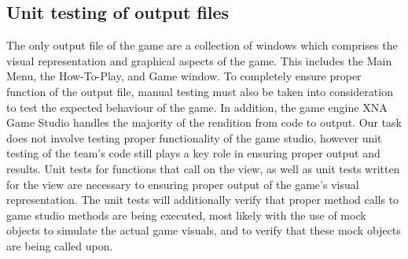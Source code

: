 \documentclass{article}
\begin{document}
\subsection{Unit testing of output files}

The only output file of the game are a collection of windows which comprises the visual representation and graphical aspects of the game. This includes the Main Menu, the How-To-Play, and Game window. To completely ensure proper function of the output file, manual testing must also be taken into consideration to test the expected behaviour of the game. In addition, the game engine XNA Game Studio handles the majority of the rendition from code to output. Our task does not involve testing proper functionality of the game studio, however unit testing of the team's code still plays a key role in ensuring proper output and results. Unit tests for functions that call on the view, as well as unit tests written for the view are necessary to ensuring proper output of the game's visual representation. The unit tests will additionally verify that proper method calls to game studio methods are being executed, most likely with the use of mock objects to simulate the actual game visuals, and to verify that these mock objects are being called upon.
\end{document}
